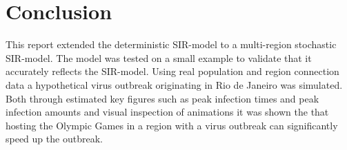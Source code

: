 \section{Conclusion}
This report extended the deterministic SIR-model to a multi-region stochastic SIR-model. The model was tested on a small example to validate that it accurately reflects the SIR-model. Using real population and region connection data a hypothetical virus outbreak originating in Rio de Janeiro was simulated. Both through estimated key figures such as peak infection times and peak infection amounts and visual inspection of animations it was shown the that hosting the Olympic Games in a region with a virus outbreak can significantly speed up the outbreak.